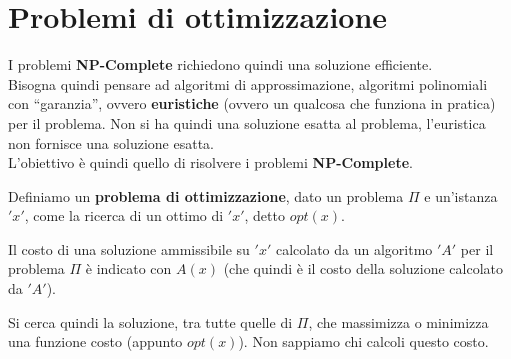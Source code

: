 						\section{Problemi di ottimizzazione}
							I problemi \textbf{NP-Complete} richiedono quindi una soluzione efficiente.\\
							Bisogna quindi pensare ad algoritmi di approssimazione, algoritmi polinomiali
							con ``garanzia'', ovvero \textbf{euristiche} (ovvero un qualcosa che funziona in
							pratica) per il problema. Non si ha quindi una soluzione esatta al problema,
							l'euristica non fornisce una soluzione esatta.\\
							L'obiettivo è quindi quello di risolvere i problemi \textbf{NP-Complete}.
							\begin{definizione}
								Definiamo un \textbf{problema di ottimizzazione}, dato un problema $\Pi$ e
								un'istanza $ 'x' $, come la ricerca di un ottimo di $ 'x' $, detto $opt(x)$.
							\end{definizione}
							\begin{definizione}
								Il costo
								di una soluzione ammissibile su $ 'x' $ calcolato da un algoritmo $ 'A' $ per il
								problema $\Pi$ è indicato con $A(x)$ (che quindi è il costo della soluzione
								calcolato da $ 'A' $).
							\end{definizione}
							\begin{nota}
								Si cerca quindi la soluzione, tra tutte quelle di $\Pi$, che massimizza o
								minimizza una funzione costo (appunto $opt(x)$). Non sappiamo chi calcoli
								questo costo.
							\end{nota}
